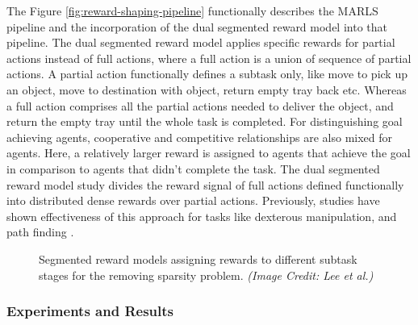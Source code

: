 \documentclass{article}
\begin{document}
The Figure \ref{fig:reward-shaping-pipeline} functionally describes the MARLS pipeline and the incorporation of the dual segmented reward model into that pipeline.
The dual segmented reward model applies specific rewards for partial actions instead of full actions, where a full action is a union of sequence of partial actions.
A partial action functionally defines a subtask only, like move to pick up an object, move to destination with object, return empty tray back etc.
Whereas a full action comprises all the partial actions needed to deliver the object, and return the empty tray until the whole task is completed.
For distinguishing goal achieving agents, cooperative and competitive relationships are also mixed for agents.
Here, a relatively larger reward is assigned to agents that achieve the goal in comparison to agents that didn’t complete the task.
The dual segmented reward model study divides the reward signal of full actions defined functionally into distributed dense rewards over partial actions.
Previously, studies have shown effectiveness of this approach for tasks like dexterous manipulation, and path finding \cite{gudimella2017deep, sartoretti2019primal}.


\begin{figure}[!tbp]
  \centering
  \hfill
  \caption{Segmented reward models assigning rewards to different subtask stages for the removing sparsity problem. \textit{(Image Credit: Lee et al.)}}
\end{figure}


\subsubsection{Experiments and Results}
\end{document}
